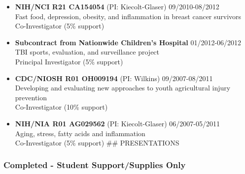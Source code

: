 \documentclass[
  english,
  letterpaper,
  DIV=11,
  numbers=noendperiod]{scrartcl}
\begin{document}
\begin{itemize}
  {04/2011-03/2013}\\
  Ohio Agriculture Research and Development Center (OARDC)\\
  Pilot study: Reducing visceral adipose tissue in postmenopausal women
  w/dietary oils\\
  Co-Investigator (1 quarter GRA support)
\item
  \textbf{NIH/NCI R21 CA154054} (PI: Kiecolt-Glaser) {09/2010-08/2012}\\
  Fast food, depression, obesity, and inflammation in breast cancer
  survivors\\
  Co-Investigator (5\% support)
\item
  \textbf{Subcontract from Nationwide Children's Hospital}
  {01/2012-06/2012}\\
  TBI sports, evaluation, and surveillance project\\
  Principal Investigator (5\% support)
\item
  \textbf{CDC/NIOSH R01 OH009194} (PI: Wilkins) {09/2007-08/2011}\\
  Developing and evaluating new approaches to youth agricultural injury
  prevention\\
  Co-Investigator (10\% support)
\item
  \textbf{NIH/NIA R01 AG029562} (PI: Kiecolt-Glaser) {06/2007-05/2011}\\
  Aging, stress, fatty acids and inflammation\\
  Co-Investigator (5\% support) \#\# PRESENTATIONS
\end{itemize}

\subsubsection{Completed - Student Support/Supplies
Only}\label{completed---student-supportsupplies-only}
\end{document}
